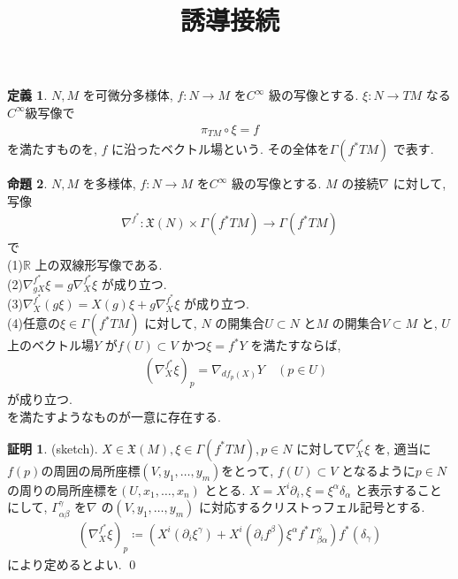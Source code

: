 \documentclass[10pt, fleqn, label-section=none]{bxjsarticle}
\title{誘導接続}
\date{}
\author{}
\theoremstyle{definition}
\newtheorem{dfn}{定義}[section]
\newtheorem{prop}[dfn]{命題}
\newtheorem*{pf*}{証明}
\renewcommand{\;}{\, ; \,}
\begin{document}
\maketitle

\section{}

\begin{dfn}
$N, M$ を可微分多様体, $f: N \rightarrow M$ を$C^\infty$ 級の写像とする.  $\xi : N \rightarrow TM$ なる$C^\infty$級写像で
\begin{align*} \pi_{TM} \circ \xi = f \end{align*}
を満たすものを, $f$ に沿ったベクトル場という. その全体を$\Gamma(f^* TM)$ で表す. 
\end{dfn}

\begin{prop}
$N, M$ を多様体, $f: N \rightarrow M$ を$C^\infty$ 級の写像とする. $M$ の接続$\nabla$ に対して, 写像
\begin{align*} \nabla^{f^*} : \mathfrak{X}(N) \times \Gamma(f^* TM) \rightarrow \Gamma(f^* TM)  \end{align*}
で \\
(1)$\mathbb R$ 上の双線形写像である. \\
(2)$\nabla^{f^*}_{gX} \xi = g \nabla^{f^*}_X \xi$ が成り立つ.\\ 
(3)$\nabla^{f^*}_X (g\xi) = X(g)\xi + g \nabla^{f^*}_X \xi$ が成り立つ.\\
(4)任意の$\xi \in \Gamma(f^* TM)$ に対して, $N$ の開集合$U \subset N$ と$M$ の開集合$V \subset M$ と, $U$ 上のベクトル場$Y$ が$f(U) \subset V$ かつ$\xi = f^*Y$ を満たすならば, 
\begin{align*} \quad (\nabla^{f^*}_X \xi)_p = \nabla _{df_p (X)} Y \quad (p \in U)\end{align*}
が成り立つ. \\
を満たすようなものが一意に存在する. 
\end{prop}
\begin{pf*}(sketch). 
$X \in \mathfrak X (M), \xi \in \Gamma(f^* TM), p \in N$ に対して$\nabla^{f^*}_X \xi$ を, 適当に$f(p)$の周囲の局所座標$(V, y_1, \ldots, y_m)$をとって, $f(U) \subset V$ となるように$p \in N$ の周りの局所座標を$(U, x_1, \ldots , x_n)$ ととる. $X = X^i \partial_i, \xi = \xi^\alpha \delta_\alpha$ と表示することにして, $\Gamma_{\alpha \beta }^\gamma$ を$\nabla$ の$(V, y_1, \ldots, y_m)$ に対応するクリストっフェル記号とする. 
\begin{align*} (\nabla^{f^*} _X \xi)_p \coloneqq ( X^i (\partial_i \xi^\gamma)  + X ^i (\partial_i f^\beta ) \xi^\alpha f^* \Gamma_{\beta \alpha} ^\gamma ) f^* (\delta_\gamma)  \end{align*}
により定めるとよい.
\qed
\end{pf*}
\end{document}
